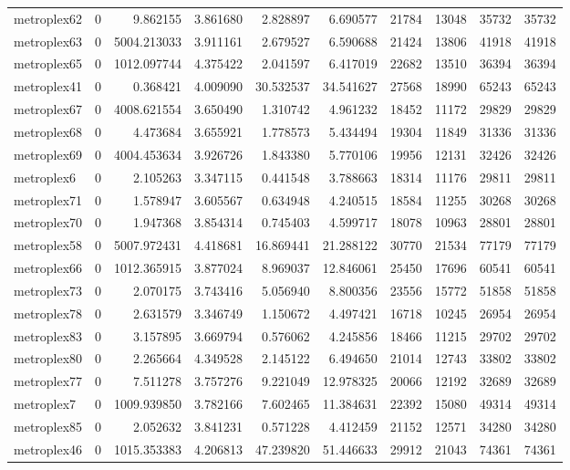 \begin{longtable}{|l|r|r|r|r|r|r|r|r|r|}
metroplex62 & 0 & 9.862155 & 3.861680 & 2.828897 & 6.690577 & 21784 & 13048 & 35732 & 35732 \\
metroplex63 & 0 & 5004.213033 & 3.911161 & 2.679527 & 6.590688 & 21424 & 13806 & 41918 & 41918 \\
metroplex65 & 0 & 1012.097744 & 4.375422 & 2.041597 & 6.417019 & 22682 & 13510 & 36394 & 36394 \\
metroplex41 & 0 & 0.368421 & 4.009090 & 30.532537 & 34.541627 & 27568 & 18990 & 65243 & 65243 \\
metroplex67 & 0 & 4008.621554 & 3.650490 & 1.310742 & 4.961232 & 18452 & 11172 & 29829 & 29829 \\
metroplex68 & 0 & 4.473684 & 3.655921 & 1.778573 & 5.434494 & 19304 & 11849 & 31336 & 31336 \\
metroplex69 & 0 & 4004.453634 & 3.926726 & 1.843380 & 5.770106 & 19956 & 12131 & 32426 & 32426 \\
metroplex6 & 0 & 2.105263 & 3.347115 & 0.441548 & 3.788663 & 18314 & 11176 & 29811 & 29811 \\
metroplex71 & 0 & 1.578947 & 3.605567 & 0.634948 & 4.240515 & 18584 & 11255 & 30268 & 30268 \\
metroplex70 & 0 & 1.947368 & 3.854314 & 0.745403 & 4.599717 & 18078 & 10963 & 28801 & 28801 \\
metroplex58 & 0 & 5007.972431 & 4.418681 & 16.869441 & 21.288122 & 30770 & 21534 & 77179 & 77179 \\
metroplex66 & 0 & 1012.365915 & 3.877024 & 8.969037 & 12.846061 & 25450 & 17696 & 60541 & 60541 \\
metroplex73 & 0 & 2.070175 & 3.743416 & 5.056940 & 8.800356 & 23556 & 15772 & 51858 & 51858 \\
metroplex78 & 0 & 2.631579 & 3.346749 & 1.150672 & 4.497421 & 16718 & 10245 & 26954 & 26954 \\
metroplex83 & 0 & 3.157895 & 3.669794 & 0.576062 & 4.245856 & 18466 & 11215 & 29702 & 29702 \\
metroplex80 & 0 & 2.265664 & 4.349528 & 2.145122 & 6.494650 & 21014 & 12743 & 33802 & 33802 \\
metroplex77 & 0 & 7.511278 & 3.757276 & 9.221049 & 12.978325 & 20066 & 12192 & 32689 & 32689 \\
metroplex7 & 0 & 1009.939850 & 3.782166 & 7.602465 & 11.384631 & 22392 & 15080 & 49314 & 49314 \\
metroplex85 & 0 & 2.052632 & 3.841231 & 0.571228 & 4.412459 & 21152 & 12571 & 34280 & 34280 \\
metroplex46 & 0 & 1015.353383 & 4.206813 & 47.239820 & 51.446633 & 29912 & 21043 & 74361 & 74361 \\

\end{longtable}
